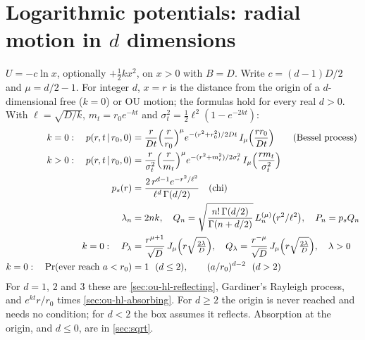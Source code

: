\documentclass[11pt]{article}
\numberwithin{equation}{section}
\newcommand{\given}{\,|\,}
\begin{document}
\section{Logarithmic potentials: radial motion in \texorpdfstring{$d$}{d} dimensions}
\label{sec:radial}

\begin{keyresults}
$U=-c\ln x$, optionally $+\tfrac12kx^2$, on $x>0$ with $B=D$. Write $c=(d-1)D/2$ and $\mu=d/2-1$. For integer $d$,
$x=r$ is the distance from the origin of a $d$-dimensional free ($k=0$) or OU motion; the formulas hold for every
real $d>0$. With $\ell=\sqrt{D/k}$, $m_t=r_0e^{-kt}$ and $\sigma_t^2=\tfrac12\ell^2(1-e^{-2kt})$:
\begin{align}
  k=0:\quad p(r,t\given r_0,0) &= \frac{r}{Dt}\Bigl(\frac{r}{r_0}\Bigr)^{\mu}e^{-(r^2+r_0^2)/2Dt}\,
  I_\mu\Bigl(\frac{rr_0}{Dt}\Bigr)\qquad\text{(Bessel process)} \\
  k>0:\quad p(r,t\given r_0,0) &= \frac{r}{\sigma_t^2}\Bigl(\frac{r}{m_t}\Bigr)^{\mu}e^{-(r^2+m_t^2)/2\sigma_t^2}\,
  I_\mu\Bigl(\frac{rm_t}{\sigma_t^2}\Bigr) \\
  p_s(r) &= \frac{2\,r^{d-1}e^{-r^2/\ell^2}}{\ell^d\,\Gamma(d/2)}\quad\text{(chi)} \\
  \lambda_n &= 2nk,\quad Q_n=\sqrt{\frac{n!\,\Gamma(d/2)}{\Gamma(n+d/2)}}\,L_n^{(\mu)}\bigl(r^2/\ell^2\bigr),
  \quad P_n=p_sQ_n \\
  k=0:\quad P_\lambda &= \frac{r^{\mu+1}}{\sqrt D}\,J_\mu\Bigl(r\sqrt{\tfrac{2\lambda}D}\Bigr),\quad
  Q_\lambda=\frac{r^{-\mu}}{\sqrt D}\,J_\mu\Bigl(r\sqrt{\tfrac{2\lambda}D}\Bigr),\quad \lambda>0 \\
  k=0:\quad \Pr(\text{ever reach }a<r_0) &= 1\ \ (d\le2),\qquad (a/r_0)^{d-2}\ \ (d>2)
\end{align}
For $d=1$, $2$ and $3$ these are \cref{sec:ou-hl-reflecting}, Gardiner's Rayleigh process, and $e^{kt}r/r_0$ times
\cref{sec:ou-hl-absorbing}. For $d\ge2$ the origin is never reached and needs no condition; for $d<2$ the box
assumes it reflects. Absorption at the origin, and $d\le0$, are in \cref{sec:sqrt}.
\end{keyresults}
\end{document}
